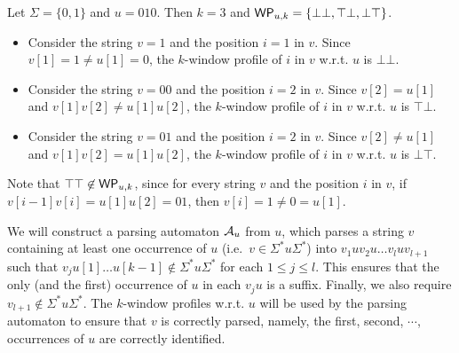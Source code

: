 \begin{example}\label{wprof-exmp}
Let $\Sigma = \{0,1\}$ and $u = 010$. Then $k=3$ and $\mathsf{WP}_{u,k}=\{\bot\bot, \top\bot, \bot\top\}$.
\begin{itemize}
\item Consider the string $v=1$ and the position $i=1$ in $v$. Since $v[1]=1 \neq u[1]=0$, the $k$-window profile of $i$ in $v$ w.r.t. $u$ is $\bot \bot$.
\item Consider the string $v=00$ and the position $i=2$ in $v$. Since $v[2]=u[1]$ and $v[1]v[2] \neq u[1]u[2]$, the $k$-window profile of $i$ in $v$ w.r.t. $u$ is $\top\bot$.
\item Consider the string $v=01$ and the position $i=2$ in $v$. Since $v[2] \neq u[1]$ and $v[1]v[2] = u[1]u[2]$, the $k$-window profile of $i$ in $v$ w.r.t. $u$ is $\bot\top$.
\end{itemize}
Note that $\top\top \not \in \mathsf{WP}_{u,k}$, since for every string $v$ and the position $i$ in $v$, if $v[i-1]v[i]=u[1]u[2]=01$, then $v[i]=1 \neq 0= u[1]$.
\end{example}


We will construct a parsing automaton $\mathcal{A}_u$ from $u$, which parses a string $v$ containing at least one occurrence of $u$ (i.e.\ $v \in \Sigma^\ast u \Sigma^\ast$) into $v_1 u v_2 u \dots v_l u v_{l+1}$ such that $v_j u[1] \dots u[k-1] \not \in \Sigma^\ast u \Sigma^\ast$ for each $1 \le j \le l$.
This ensures that the only (and the first) occurrence of $u$ in each $v_j u$ is a suffix.
Finally, we also require $v_{l+1} \not \in \Sigma^\ast u \Sigma^\ast$.
The $k$-window profiles w.r.t. $u$ will be used by the parsing automaton to ensure that $v$ is correctly parsed, namely, the first, second, $\cdots$, occurrences of $u$ are correctly identified.

